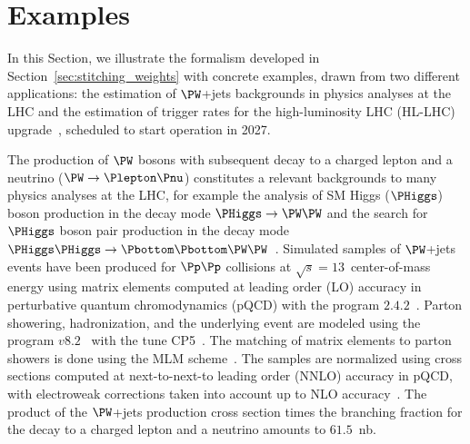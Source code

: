 \section{Examples}
\label{sec:examples}

In this Section, we illustrate the formalism developed in Section~\ref{sec:stitching_weights} with concrete examples,
drawn from two different applications: the estimation of 
$\PW$+jets backgrounds in physics analyses at the LHC
and the estimation of trigger rates for the high-luminosity LHC (HL-LHC) upgrade~\cite{TDR_Phase2_LHC},
scheduled to start operation in 2027.

The 
production of $\PW$ bosons with subsequent decay to a charged lepton and a neutrino ($\PW \to \Plepton\Pnu$)
constitutes a relevant backgrounds to many physics analyses at the LHC,
for example the analysis of SM Higgs ($\PHiggs$) boson production in the decay 
mode $\PHiggs \to \PW\PW$
and the search for $\PHiggs$ boson pair production in the decay 
mode $\PHiggs\PHiggs \to \Pbottom\Pbottom\PW\PW$~\cite{ATLAS:2014aga,Aad:2019yxi,CMS-HIG-13-027,CMS-HIG-17-006}.
Simulated samples of $\PW$+jets 
events have been produced for $\Pp\Pp$ collisions at $\sqrt{s}=13$~\TeV center-of-mass energy
using matrix elements computed at leading order (LO) 
accuracy in perturbative quantum chromodynamics (pQCD)
with the program \MGvATNLO $2.4.2$~\cite{Alwall:2014hca}.
Parton showering, hadronization, and the underlying event are modeled using the program \PYTHIA $v8.2$~\cite{Sjostrand:2014zea} with the tune \textrm{CP5}~\cite{Sirunyan:2019dfx}.
The matching of matrix elements to parton showers is done using the \textrm{MLM} scheme~\cite{Alwall:2007fs}.%
The 
samples are normalized using cross sections computed at next-to-next-to leading order (NNLO) accuracy in pQCD,
with electroweak corrections taken into account up to NLO accuracy~\cite{Li:2012wna}.
The product of the $\PW$+jets production cross section times the branching fraction for the decay to a charged lepton and a neutrino amounts to $61.5$~nb.

